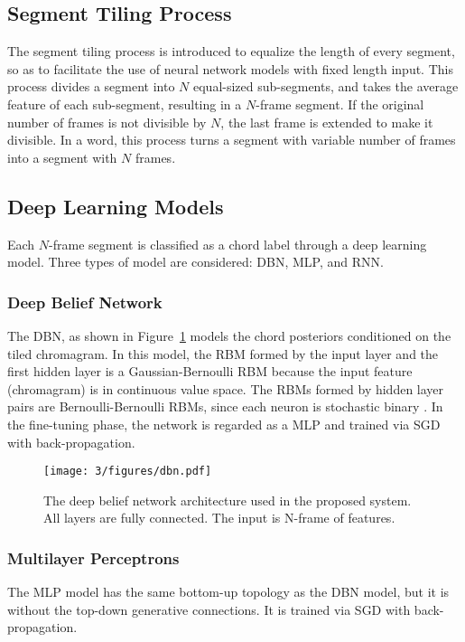 \subsection{Segment Tiling Process} \label{sec:3-seg-tile}

The segment tiling process is introduced to equalize the length of every segment, so as to facilitate the use of neural network models with fixed length input. This process divides a segment into $N$ equal-sized sub-segments, and takes the average feature of each sub-segment, resulting in a $N$-frame segment. If the original number of frames is not divisible by $N$, the last frame is extended to make it divisible. In a word, this process turns a segment with variable number of frames into a segment with $N$ frames.

\subsection{Deep Learning Models} \label{sec:3-dlmodel}

Each $N$-frame segment is classified as a chord label through a deep learning model. Three types of model are considered: DBN, MLP, and RNN.

\subsubsection{Deep Belief Network}

The DBN, as shown in Figure~\ref{fig:3-dbn} models the chord posteriors conditioned on the tiled chromagram. In this model, the RBM formed by the input layer and the first hidden layer is a Gaussian-Bernoulli RBM because the input feature (chromagram) is in continuous value space. The RBMs formed by hidden layer pairs are Bernoulli-Bernoulli RBMs, since each neuron is stochastic binary \cite{hinton2006reducing}. In the fine-tuning phase, the network is regarded as a MLP and trained via SGD with back-propagation.

\begin{figure}[htb]
\centering
\texttt{[image: 3/figures/dbn.pdf]}
\caption{The deep belief network architecture used in the proposed system. All layers are fully connected. The input is N-frame of features.}
\label{fig:3-dbn}
\end{figure}

\subsubsection{Multilayer Perceptrons}
The MLP model has the same bottom-up topology as the DBN model, but it is without the top-down generative connections. It is trained via SGD with back-propagation.

